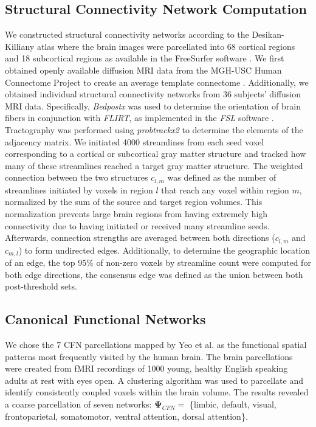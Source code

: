 \subsection{Structural Connectivity Network Computation} We constructed structural connectivity networks according to the Desikan-Killiany atlas where the brain images were parcellated into 68 cortical regions and 18 subcortical regions as available in the FreeSurfer software \cite{Fischl2002, Desikan2006}. We first obtained openly available diffusion MRI data from the MGH-USC Human Connectome Project to create an average template connectome \cite{McNab2013}. Additionally, we obtained individual structural connectivity networks from 36 subjects' diffusion MRI data. Specifically, \textit{Bedpostx} was used to determine the orientation of brain fibers in conjunction with \textit{FLIRT}, as implemented in the \textit{FSL} software \cite{Jenkinson2012}. Tractography was performed using \textit{probtrackx2} to determine the elements of the adjacency matrix. We initiated 4000 streamlines from each seed voxel corresponding to a cortical or subcortical gray matter structure and tracked how many of these streamlines reached a target gray matter structure. The weighted connection between the two structures $c_{l,m}$ was defined as the number of streamlines initiated by voxels in region $l$ that reach any voxel within region $m$, normalized by the sum of the source and target region volumes. This normalization prevents large brain regions from having extremely high connectivity due to having initiated or received many streamline seeds. Afterwards, connection strengths are averaged between both directions ($c_{l,m}$ and $c_{m,l}$) to form undirected edges. Additionally, to determine the geographic location of an edge, the top 95\% of non-zero voxels by streamline count were computed for both edge directions, the consensus edge was defined as the union between both post-threshold sets.

\subsection{Canonical Functional Networks}
We chose the 7 CFN parcellations mapped by Yeo et al. \cite{Yeo2011} as the functional spatial patterns most frequently visited by the human brain. The brain parcellations were created from fMRI recordings of 1000 young, healthy English speaking adults at rest with eyes open. A clustering algorithm was used to parcellate and identify consistently coupled voxels within the brain volume. The results revealed a coarse parcellation of seven networks: $\pmb{\Psi}_{CFN} = $ \{limbic, default, visual, frontoparietal, somatomotor, ventral attention, dorsal attention\}.

